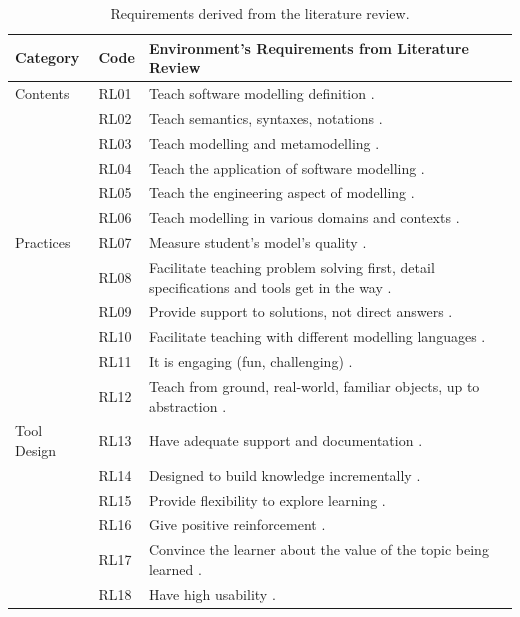 \documentclass[12pt, a4paper]{report} \usepackage[titletoc]{appendix}
\begin{document}
\begin{table}[t!]\caption{Requirements derived from the literature review.}
\label{literature-review-1}
\begin{center}
\begin{tabular}{ p{1.6cm}p{1cm}p{10.4cm} } 
\hline
Category & Code & Environment's Requirements from Literature Review \\
\hline
\multirow{1}{2cm}{Contents} 
& RL01 & Teach software modelling definition \cite{borstler2012teaching}. \\ 
& RL02 & Teach semantics, syntaxes, notations \cite{borstler2012teaching}. \\ 
& RL03 & Teach modelling and metamodelling \cite{bezivin2009teaching, ober2007teaching}. \\
& RL04 & Teach the application of software modelling \cite{bezivin2009teaching, liebel2015ready}. \\
& RL05 & Teach the engineering aspect of modelling \cite{paige2014bad}.\\
& RL06 & Teach modelling in various domains and contexts \cite{borstler2012teaching, paige2014bad}.\\
\hline
\multirow{1}{2cm}{Practices} 
& RL07 & Measure student's model's quality \cite{Akayama2013}.\\
& RL08 & Facilitate teaching problem solving first, detail specifications and tools get in the way \cite{paige2014bad}. \\
& RL09 & Provide support to solutions, not direct answers \cite{paige2014bad}. \\ 
& RL10 & Facilitate teaching with different modelling languages \cite{bezivin2009teaching, paige2014bad}.\\ 
& RL11 & It is engaging (fun, challenging) \cite{paige2014bad}.\\ 
& RL12 & Teach from ground, real-world, familiar objects, up to abstraction \cite{engels2005teaching}.\\ 
\hline
\multirow{1}{2cm}{Tool Design}
& RL13 & Have adequate support and documentation \cite{liebel2015ready}. \\
& RL14 & Designed to build knowledge incrementally \cite{lethbridge2014teaching}.\\
& RL15 & Provide flexibility to explore learning \cite{lethbridge2014teaching}. \\
& RL16 & Give positive reinforcement \cite{lethbridge2014teaching}. \\
& RL17 & Convince the learner about the value of the topic being learned \cite{lethbridge2014teaching}. \\ 
& RL18 & Have high usability \cite{lethbridge2014teaching}.\\ 
\hline
\end{tabular}
\end{center}
\end{table}
\end{document}

